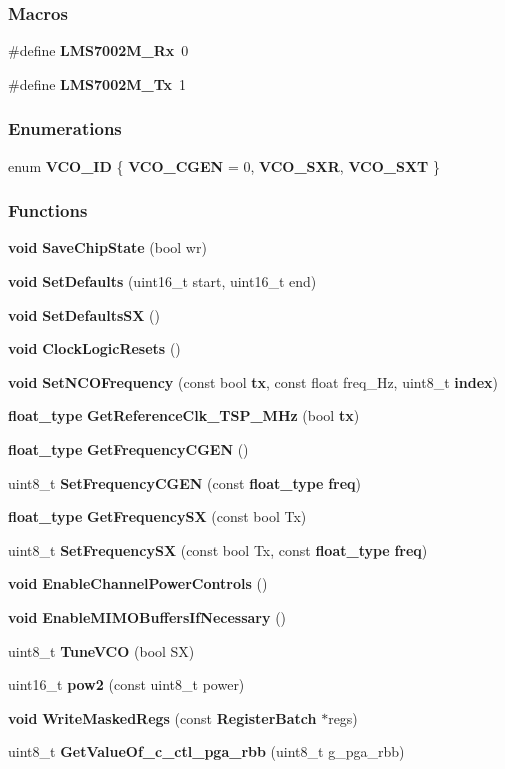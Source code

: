 \subsubsection*{Macros}
\begin{DoxyCompactItemize}
\item 
\#define {\bf L\+M\+S7002\+M\+\_\+\+Rx}~0
\item 
\#define {\bf L\+M\+S7002\+M\+\_\+\+Tx}~1
\end{DoxyCompactItemize}
\subsubsection*{Enumerations}
\begin{DoxyCompactItemize}
\item 
enum {\bf V\+C\+O\+\_\+\+ID} \{ {\bf V\+C\+O\+\_\+\+C\+G\+EN} = 0, 
{\bf V\+C\+O\+\_\+\+S\+XR}, 
{\bf V\+C\+O\+\_\+\+S\+XT}
 \}
\end{DoxyCompactItemize}
\subsubsection*{Functions}
\begin{DoxyCompactItemize}
\item 
{\bf void} {\bf Save\+Chip\+State} (bool wr)
\item 
{\bf void} {\bf Set\+Defaults} (uint16\+\_\+t start, uint16\+\_\+t end)
\item 
{\bf void} {\bf Set\+Defaults\+SX} ()
\item 
{\bf void} {\bf Clock\+Logic\+Resets} ()
\item 
{\bf void} {\bf Set\+N\+C\+O\+Frequency} (const bool {\bf tx}, const float freq\+\_\+\+Hz, uint8\+\_\+t {\bf index})
\item 
{\bf float\+\_\+type} {\bf Get\+Reference\+Clk\+\_\+\+T\+S\+P\+\_\+\+M\+Hz} (bool {\bf tx})
\item 
{\bf float\+\_\+type} {\bf Get\+Frequency\+C\+G\+EN} ()
\item 
uint8\+\_\+t {\bf Set\+Frequency\+C\+G\+EN} (const {\bf float\+\_\+type} {\bf freq})
\item 
{\bf float\+\_\+type} {\bf Get\+Frequency\+SX} (const bool Tx)
\item 
uint8\+\_\+t {\bf Set\+Frequency\+SX} (const bool Tx, const {\bf float\+\_\+type} {\bf freq})
\item 
{\bf void} {\bf Enable\+Channel\+Power\+Controls} ()
\item 
{\bf void} {\bf Enable\+M\+I\+M\+O\+Buffers\+If\+Necessary} ()
\item 
uint8\+\_\+t {\bf Tune\+V\+CO} (bool SX)
\item 
uint16\+\_\+t {\bf pow2} (const uint8\+\_\+t power)
\item 
{\bf void} {\bf Write\+Masked\+Regs} (const {\bf Register\+Batch} $\ast$regs)
\item 
uint8\+\_\+t {\bf Get\+Value\+Of\+\_\+c\+\_\+ctl\+\_\+pga\+\_\+rbb} (uint8\+\_\+t g\+\_\+pga\+\_\+rbb)
\end{DoxyCompactItemize}


